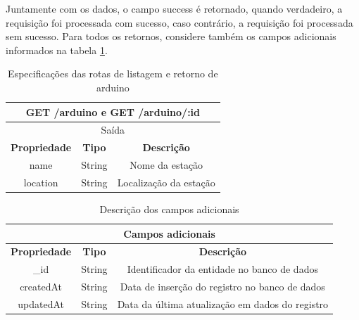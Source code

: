 Juntamente com os dados, o campo success é retornado, quando verdadeiro, a requisição foi processada com sucesso, caso contrário, a requisição foi processada sem sucesso. Para todos os retornos, considere também os campos adicionais informados na tabela \ref{table:campos_adicionais}.

\begin{table}[H]
    \centering
    \caption{Especificações das rotas de listagem e retorno de arduino}
    \begin{tabular}{c|c|c}
    \hline
    \multicolumn{3}{c}{\textbf{GET /arduino e GET /arduino/:id}} \\ \hline
    \multicolumn{3}{c}{Saída}                                                          \\ \hline
    \textbf{Propriedade}         & \textbf{Tipo}         & \textbf{Descrição}            \\  \hline
    name                         & String                & Nome da estação               \\  \hline
    location                     & String                & Localização da estação \\

    \hline
    \end{tabular}
\end{table}

\begin{table}[H]
    \centering
    \caption{Descrição dos campos adicionais \label{table:campos_adicionais}}
    \begin{tabular}{c|c|c}
    \hline
    \multicolumn{3}{c}{\textbf{Campos adicionais}} \\ \hline
    \textbf{Propriedade}         & \textbf{Tipo}         & \textbf{Descrição}            \\  \hline
    \_id                         & String                & Identificador da entidade no banco de dados      \\  \hline
    createdAt                    & String                & Data de inserção do registro no banco de dados         \\ \hline
    updatedAt                    & String                & Data da última atualização em dados do registro         \\ \hline
    \end{tabular}
\end{table}

